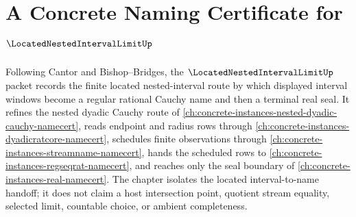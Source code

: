 \chapter{A Concrete Naming Certificate for $\LocatedNestedIntervalLimitUp$}
\label{ch:concrete-instances-located-nested-interval-limit-namecert}

Following Cantor and Bishop--Bridges, the $\LocatedNestedIntervalLimitUp$ packet records the finite located nested-interval route by which displayed interval windows become a regular rational Cauchy name and then a terminal real seal. It refines the nested dyadic Cauchy route of \autoref{ch:concrete-instances-nested-dyadic-cauchy-namecert}, reads endpoint and radius rows through \autoref{ch:concrete-instances-dyadicratcore-namecert}, schedules finite observations through \autoref{ch:concrete-instances-streamname-namecert}, hands the scheduled rows to \autoref{ch:concrete-instances-regseqrat-namecert}, and reaches only the seal boundary of \autoref{ch:concrete-instances-real-namecert}. The chapter isolates the located interval-to-name handoff; it does not claim a host intersection point, quotient stream equality, selected limit, countable choice, or ambient completeness.

